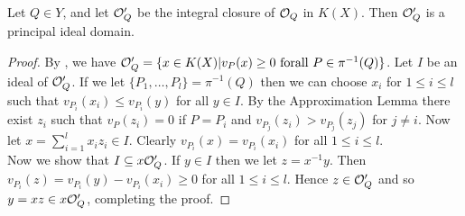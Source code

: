 \begin{lem}\label{pidlemma}
 Let $Q\in Y$, and let ${\cal O}_Q'$ be the integral closure of ${\cal O}_Q$ in $K(X)$.
 Then ${\cal O}_Q'$ is a principal ideal domain.
\end{lem}
\begin{proof}
 By \cite[Cor. III.3.5]{stichtenoth}, we have ${\cal O}_Q' = \{x\in K(X)|v_P(x) \geq 0 \ {\rm for all} \ P\in \pi^{-1}(Q)\}$.
 Let $I$ be an ideal of ${\cal O}_Q'$.
 If we let $\{P_1,\ldots, P_l\} = \pi^{-1}(Q)$ then we can choose $x_i$ for $1\leq i \leq l$ such that $v_{P_i}(x_i) \leq v_{P_i}(y)$ for all $y\in I$.
 By the Approximation Lemma there exist $z_i$ such that $v_P (z_i) = 0$ if $P=P_i$ and $v_{P_j}(z_i) > v_{P_j}(z_j)$ for $j\neq i$.
 Now let $x = \sum_{i=1}^l x_iz_i \in I$.
 Clearly $v_{P_i}(x) = v_{P_i}(x_i)$ for all $1\leq i\leq l$.\\
 Now we show that $I \subseteq x{\cal O}_Q'$.
 If $y\in I$ then we let $z = x^{-1}y$.
 Then $v_{P_i}(z) = v_{P_i}(y) - v_{P_i}(x_i) \geq 0$ for all $1\leq i\leq l$.
Hence $z\in {\cal O}_Q'$ and so $y = xz \in x{\cal O}_Q'$, completing the proof.
\end{proof}


